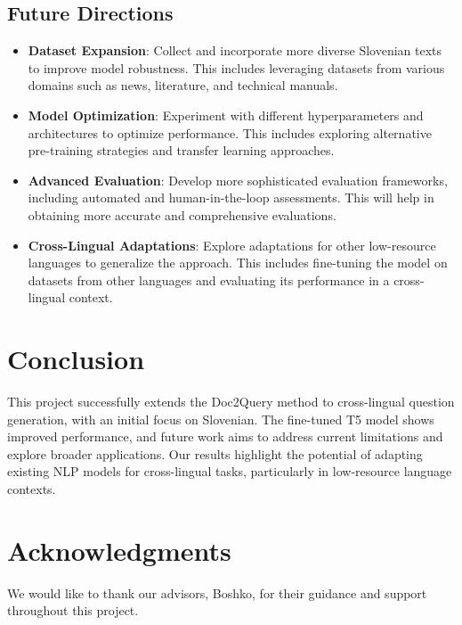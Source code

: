 \documentclass[fleqn,moreauthors,10pt]{ds_report}
\begin{document}
\subsection*{Future Directions}
\begin{itemize}[noitemsep]
    \item \textbf{Dataset Expansion}: Collect and incorporate more diverse Slovenian texts to improve model robustness. This includes leveraging datasets from various domains such as news, literature, and technical manuals.
    \item \textbf{Model Optimization}: Experiment with different hyperparameters and architectures to optimize performance. This includes exploring alternative pre-training strategies and transfer learning approaches.
    \item \textbf{Advanced Evaluation}: Develop more sophisticated evaluation frameworks, including automated and human-in-the-loop assessments. This will help in obtaining more accurate and comprehensive evaluations.
    \item \textbf{Cross-Lingual Adaptations}: Explore adaptations for other low-resource languages to generalize the approach. This includes fine-tuning the model on datasets from other languages and evaluating its performance in a cross-lingual context.
\end{itemize}



\section*{Conclusion}
This project successfully extends the Doc2Query method to cross-lingual question generation, with an initial focus on Slovenian. The fine-tuned T5 model shows improved performance, and future work aims to address current limitations and explore broader applications. Our results highlight the potential of adapting existing NLP models for cross-lingual tasks, particularly in low-resource language contexts.



\section*{Acknowledgments}
We would like to thank our advisors, Boshko, for their guidance and support throughout this project.




\end{document}
